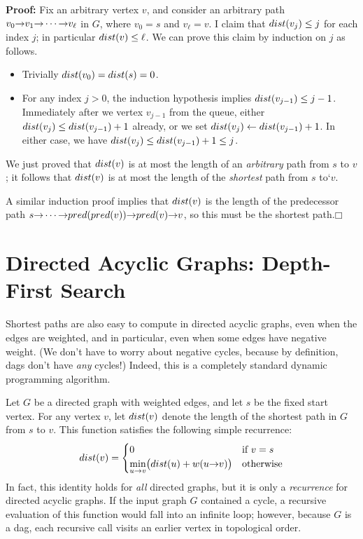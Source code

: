 \textbf{Proof:} Fix an arbitrary vertex $v$, and consider an arbitrary path $v_0\mathord{\rightarrow}v_1\mathord{\rightarrow}\cdots\mathord{\rightarrow}v_\ell$ in $G$, where $v_0 = s$ and $v_\ell = v$.
I claim that $dist(v_j) \le j$ for each index $j$; in particular $dist(v) \le \ell$.
We can prove this claim by induction on $j$ as follows.
\begin{itemize}
\item Trivially $dist(v_0) = dist(s) = 0$.
\item For any index $j > 0$, the induction hypothesis implies $dist(v_{j-1}) \le j - 1$.
Immediately after we  vertex $v_{j-1}$ from the queue, either $dist(v_j) \le dist(v_{j-1}) + 1$ already, or we set $dist(v_j) \gets dist(v_{j-1}) + 1$.
In either case, we have $dist(v_j) \le dist(v_{j-1}) + 1 \le j$.
\end{itemize}
We just proved that $dist(v)$ is at most the length of an \textit{arbitrary} path from $s$ to $v$; it follows that $dist(v)$ is at most the length of the \textit{shortest} path from $s$ to‘$v$.

A similar induction proof implies that $dist(v)$ is the length of the predecessor path $s\mathord{\rightarrow}\cdots\mathord{\rightarrow}pred(pred(v))\mathord{\rightarrow}pred(v)\mathord{\rightarrow}v$, so this must be the shortest path.\hfill$\mdlgwhtsquare$

\section{Directed Acyclic Graphs: Depth-First Search}
\label{sec:8.5}

Shortest paths are also easy to compute in directed acyclic graphs, even when the edges are weighted, and in particular, even when some edges have negative weight.
(We don’t have to worry about negative cycles, because by definition, dags don’t have \textit{any} cycles!)
Indeed, this is a completely standard dynamic programming algorithm.

Let $G$ be a directed graph with weighted edges, and let $s$ be the fixed start vertex.
For any vertex $v$, let $dist(v)$ denote the length of the shortest path in $G$ from $s$ to $v$.
This function satisfies the following simple recurrence:
\[
dist(v) = \begin{cases}
0 & \text{if } v = s\\
\displaystyle\min_{u\mathord{\rightarrow}v} \bigl(dist(u) + w(u\mathord{\rightarrow}v)\bigr) & \text{otherwise}
\end{cases}
\]
In fact, this identity holds for \textit{all} directed graphs, but it is only a \textit{recurrence} for directed acyclic graphs.
If the input graph $G$ contained a cycle, a recursive evaluation of this function would fall into an infinite loop; however, because $G$ is a dag, each recursive call visits an earlier vertex in topological order.

